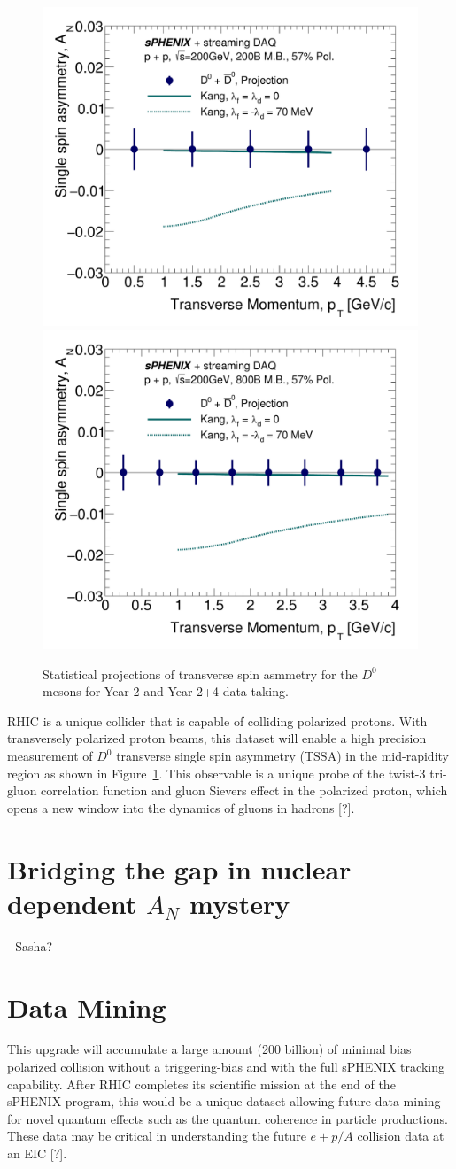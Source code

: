 \begin{figure}[htbp]
\begin{center}
\includegraphics[width=.49\linewidth]{figs/RAA_DB_theory_root_AN_D0D0bar_pp200B.pdf}
\includegraphics[width=.49\linewidth]{figs/RAA_DB_theory_root_AN_D0D0bar.pdf}
\caption{Statistical projections of transverse spin asmmetry for the $D^0$ mesons for Year-2 and Year 2+4 data taking.}
\label{fig:AN-D0}
\end{center}
\end{figure}


RHIC is a unique collider that is capable of colliding polarized protons. With transversely polarized proton beams, this dataset will enable a high precision measurement of $D^0$ transverse single spin asymmetry (TSSA) in the mid-rapidity region as shown in Figure~\ref{fig:AN-D0}. This observable is a unique probe of the twist-3 tri-gluon correlation function and gluon Sievers effect in the polarized proton, which opens a new window into the dynamics of gluons in hadrons [?]. 
 

\section{Bridging the gap in nuclear dependent $A_N$ mystery}

- Sasha?
 
 
\section{Data Mining}

This upgrade will accumulate a large amount (200 billion) of minimal bias polarized \pp collision without a triggering-bias and with the full sPHENIX tracking capability. After RHIC completes its scientific mission at the end of the sPHENIX program, this would be a unique dataset allowing future data mining for novel quantum effects such as the quantum coherence in particle productions. These \pp data may be critical in understanding the future $e+p/A$ collision data at an EIC [?]. 